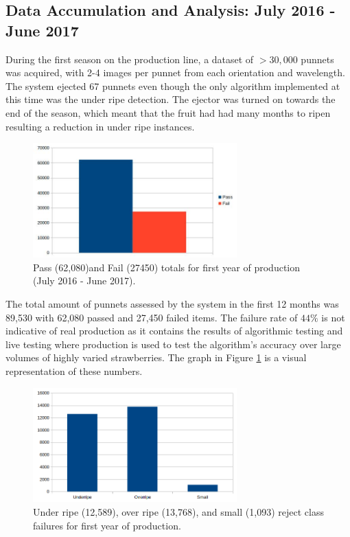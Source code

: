 \documentclass[fleqn,twoside,12pt]{report}
\begin{document}
\subsection{Data Accumulation and Analysis: July 2016 - June 2017 }

During the first season on the production line, a dataset of $>30,000$ punnets was acquired, with 2-4 images per punnet from each orientation and wavelength. The system ejected 67 punnets even though the only algorithm implemented at this time was the under ripe detection. The ejector was turned on towards the end of the season, which meant that the fruit had had many months to ripen resulting a reduction in under ripe instances.   


\begin{figure}[h]
	\centering
	\includegraphics[width=0.7\textwidth]{first_year.jpg}
	\caption{Pass (62,080)and Fail (27450) totals for first year of production (July 2016 - June 2017).}
	\label{fig:first_year}
\end{figure}

The total amount of punnets assessed by the system in the first 12 months was 89,530 with 62,080 passed and 27,450 failed items. The failure rate of $44\%$ is not indicative of real production as it contains the results of algorithmic testing and live testing where production is used to test the algorithm's accuracy over large volumes of highly varied strawberries. The graph in Figure \ref{fig:first_year} is a visual representation of these numbers.


\begin{figure}[h]
	\centering
	\includegraphics[width=0.7\textwidth]{first_year_cat.png}
	\caption{Under ripe (12,589), over ripe (13,768), and small (1,093) reject class failures for first year of production.}
	\label{fig:first_year_breakdown}
\end{figure}
\end{document}

